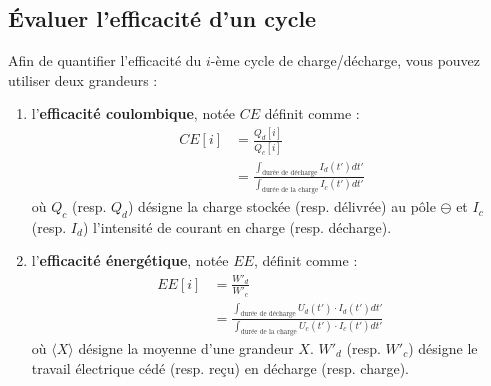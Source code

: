 \documentclass[twoside,a4paper,11pt,addpoints]{exam}%
\begin{document}
\subsection{Évaluer l'efficacité d'un cycle}
\label{subsec:efficacite}
Afin de quantifier l'efficacité du $i$-ème cycle de charge/décharge, vous pouvez utiliser deux grandeurs : 
\begin{enumerate}
\item l'\textbf{efficacité coulombique}, notée $CE$ définit comme : 
\begin{align}
CE [i] &= \frac{Q_d [i] }{Q_c [i]} \label{eq:CE}\\
&= \frac{\int_{\text{durée de décharge}} I_d (t') dt'}{\int_{\text{durée de la charge}} I_c (t') dt'}
\end{align}
où $Q_c$ (resp. $Q_d$) désigne la charge stockée (resp. délivrée) au pôle $\ominus$ et $I_c$ (resp. $I_d$) l'intensité de courant en charge (resp. décharge).

\item l'\textbf{efficacité énergétique}, notée $EE$, définit comme :
\begin{align}
EE [i] &= \frac{W'_d}{W'_c} \label{eq:EE}\\
&= \frac{\int_{\text{durée de décharge}} U_d (t') \cdot I_d (t') dt'}{\int_{\text{durée de la charge}} U_c (t') \cdot I_c (t') dt'} \
\end{align}
où $\langle X\rangle$ désigne la moyenne d'une grandeur $X$. $W'_d$ (resp. $W'_c$) désigne le travail électrique cédé (resp. reçu) en décharge (resp. charge).



\end{enumerate}



\end{document}
